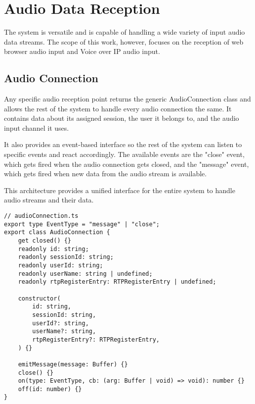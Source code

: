 \chapter{Audio Data Reception}

\label{AudioDataReception}

The system is versatile and is capable of handling a wide variety of input audio data streams. The scope of this work, 
however, focuses on the reception of web browser audio input and Voice over IP audio input.


\section{Audio Connection}

Any specific audio reception point returns the generic AudioConnection class and allows the rest of the system to 
handle every audio connection the same. 
It contains data about its assigned session, the user it belongs to, and the audio input channel it uses.

It also provides an event-based interface so the rest of the system can listen to specific events and react  
accordingly. The available events are the "close" event, which gets fired when the audio connection gets closed, and 
the "message" event, which gets fired when new data from the audio stream is available.

This architecture provides a unified interface for the entire system to handle audio streams and their data.

\begin{verbatim}
// audioConnection.ts
export type EventType = "message" | "close";
export class AudioConnection {
    get closed() {}
    readonly id: string;
    readonly sessionId: string;
    readonly userId: string;
    readonly userName: string | undefined;
    readonly rtpRegisterEntry: RTPRegisterEntry | undefined;

    constructor(
        id: string,
        sessionId: string,
        userId?: string,
        userName?: string,
        rtpRegisterEntry?: RTPRegisterEntry,
    ) {}

    emitMessage(message: Buffer) {}
    close() {}
    on(type: EventType, cb: (arg: Buffer | void) => void): number {}
    off(id: number) {}
}
\end{verbatim}


